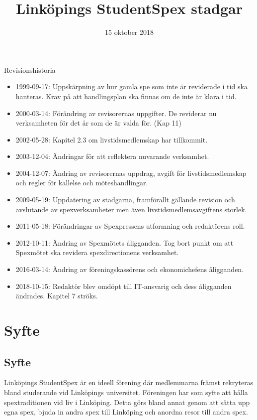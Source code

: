 \documentclass[a4paper]{article}
\title{Linköpings StudentSpex stadgar}
\author{}
\date{15 oktober 2018}
\begin{document}
\maketitle

{\Large Revisionshistoria }
\begin{itemize}
  \item 1999-09-17: Uppskärpning av hur gamla spe som inte är reviderade i tid ska hanteras. Krav på att handlingsplan ska finnas om de inte är klara i tid.
  \item 2000-03-14: Förändring av revisorernas uppgifter. De reviderar nu verksamheten för det år som de är valda för. (Kap 11)
  \item 2002-05-28: Kapitel 2.3 om livstidsmedlemskap har tillkommit.
  \item 2003-12-04: Ändringar för att reflektera nuvarande verksamhet.
  \item 2004-12-07: Ändring av revisorernas uppdrag, avgift för livstidsmedlemskap och regler för kallelse och möteshandlingar.
  \item 2009-05-19: Uppdatering av stadgarna, framförallt gällande revision och avslutande av spexverksamheter men även livstidsmedlemsavgiftens storlek.
  \item 2011-05-18: Förändringar av Spexpressens utformning och redaktörens roll.
  \item 2012-10-11: Ändring av Spexmötets åligganden. Tog bort punkt om att Spexmötet ska revidera spexdirectionens verksamhet.
  \item 2016-03-14: Ändring av föreningskassörens och ekonomichefens åligganden.
  \item 2018-10-15: Redaktör blev omdöpt till IT-ansvarig och dess åligganden ändrades. Kapitel 7 ströks.
\end{itemize}

\section{Syfte}
\subsection{Syfte}
Linköpings StudentSpex är en ideell förening där medlemmarna främst rekryteras bland studerande vid Linköpings universitet. Föreningen har som syfte att hålla spextraditionen vid liv i Linköping. Detta görs bland annat genom att sätta upp egna spex, bjuda in andra spex till Linköping och anordna resor till andra spex.
\end{document}
